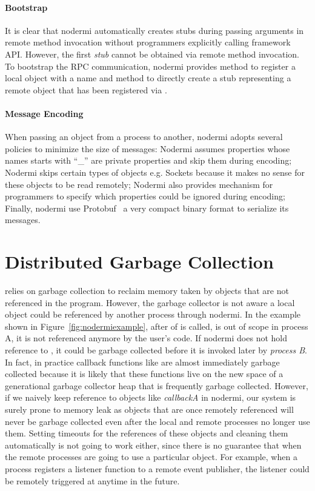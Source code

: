 \paragraph{Bootstrap}
It is clear that nodermi automatically creates stubs during
passing arguments in remote method invocation without programmers
explicitly calling framework API.
However, the first \emph{stub} cannot be obtained
via remote method invocation.
To bootstrap the RPC communication,
nodermi provides  method
to register a local object with a name
and  method to 
directly create a stub representing
a remote object that has been registered via
.

\paragraph{Message Encoding}
When passing an object from a process to another,
nodermi adopts several policies to minimize the size of messages:
Nodermi assumes properties whose names starts with ``\_'' are private properties
and skip them during encoding;
Nodermi skips certain types of objects e.g. Sockets because
it makes no sense for these objects to be read remotely;
Nodermi also provides mechanism for programmers to specify which
properties could be ignored during encoding;
Finally, nodermi use Protobuf~\cite{protobuf} a very compact binary format 
to serialize its messages.


\section{Distributed Garbage Collection}
\js{} relies on garbage collection to reclaim memory taken by
objects that are not referenced in the program.
However, the garbage collector is not aware a local object
could be referenced by another process through nodermi.
In the example shown in Figure~\ref{fig:nodermiexample},
after  of  is called,
 is out of scope in process A,
it is not referenced anymore by the user's code.
If nodermi does not hold reference to ,
it could be garbage collected before it is invoked later
by \emph{process B}.
In fact, in practice callback functions like  are almost
immediately garbage collected because it is likely that these functions
live on the new space of a generational garbage collector heap that is frequently
garbage collected.
However, if we naively keep reference to objects like
 \emph{callbackA} in nodermi,
our system is surely prone to memory leak
as objects that are once remotely referenced
will never be garbage collected even after the local and remote processes
no longer use them.
Setting timeouts for the references of these objects
and cleaning them automatically 
is not going to work either,
since there is no guarantee that when the remote processes are
 going to use a particular object.
For example,
when a process registers a listener function to a remote event publisher,
the listener could be remotely triggered at anytime in the future.


